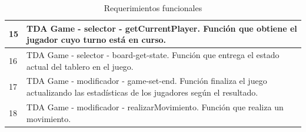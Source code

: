 \documentclass[12pt]{article}
\begin{document}
\begin{table}[h]
\begin{tabular}{|l|p{10cm}|}
			\hline
			15 &  TDA Game - selector - getCurrentPlayer. Función que obtiene el jugador cuyo turno está en curso.\\
			\hline
			16 &  TDA Game - selector - board-get-state. Función que entrega el estado actual del tablero en el juego.\\
			\hline
			17 &  TDA Game - modificador - game-set-end. Función finaliza el juego actualizando las estadísticas de los jugadores según el resultado.\\
			\hline
			18 &  TDA Game - modificador - realizarMovimiento. Función que realiza un movimiento.\\
			\hline
		\end{tabular}
		\caption{Requerimientos funcionales}
		\label{tab:RFs}
	\end{table}
    
\end{document}
